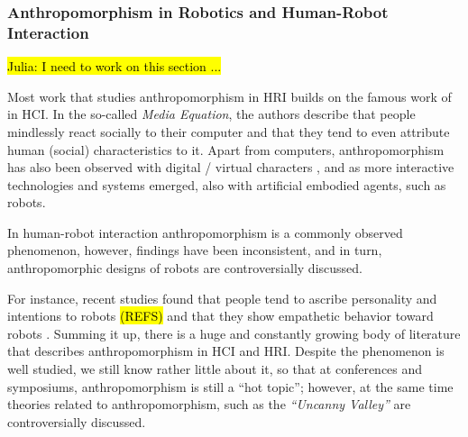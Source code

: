 \documentclass{frontiersSCNS} %
\begin{document}




\subsubsection{Anthropomorphism in Robotics and Human-Robot Interaction\\}
\label{sec:anthropomorphism-robotics}

\hl{Julia: I need to work on this section ...}


Most work that studies anthropomorphism in HRI builds on the famous work of \cite{reeves_media_1996} in HCI. In the so-called \textit{Media Equation}, the authors describe that people mindlessly react socially to their computer and that they tend to even attribute human (social) characteristics to it. Apart from computers, anthropomorphism has also been observed with digital / virtual characters \citep{reeves_media_1996,
nass_anthropocentrism_1995}, and as more interactive technologies and systems emerged, also with artificial embodied agents, such as robots. 

In human-robot interaction anthropomorphism is a commonly observed phenomenon, however, findings have been inconsistent, and in turn, anthropomorphic designs of robots are controversially discussed.


For instance, recent studies found that people tend to ascribe personality and intentions to robots \hl{(REFS)} and that they show empathetic behavior toward robots \citep{rosenthal-vonderputten_experimental_2013}. Summing it up, there is a huge and constantly growing body of literature that describes anthropomorphism in HCI and HRI. Despite the phenomenon is well studied, we still know rather little about it, so that at conferences and symposiums, anthropomorphism is still a ``hot topic''; however, at the same time theories related to anthropomorphism, such as the \textit{``Uncanny Valley''} are controversially discussed.
\end{document}
